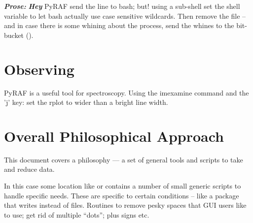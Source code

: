 \textbf{\emph{Prose:}} \textbf{\emph{Hey}} PyRAF send the line to bash; but! using a sub-shell
set {\color{verbcolor}{\verb#export#}} the {\color{verbcolor}{\verb#LC_ALL=C;#}}
shell variable to let bash actually use case sensitive wildcards. Then
{\color{verbcolor}{\verb#rm [a-z]_*fits 2> /dev/null;#}} remove the
file -- and in case there is some whining about the process, send the
whines to the bit-bucket ({\color{verbcolor}{\verb#/dev/null#}}).


\section{Observing}
PyRAF  is a useful tool for spectroscopy. Using
the imexamine command and the 'j' key: set the rplot to wider than a bright
line width. 


\clearpage
\section{Overall Philosophical Approach}

This document covers a philosophy --- a set of general tools and
scripts to take and reduce data.

In this case some location like {\color{verbcolor}{\verb#/opt/myobs/iraf/#}}
or {\color{verbcolor}{\verb#~/iraf/#}} contains a number of small generic
{\color{verbcolor}{\verb#.cl#}} scripts to handle specific needs. These
are specific to certain conditions -- like a package that writes {\color{verbcolor}{\verb#.fts#}}
instead of {\color{verbcolor}{\verb#.fits#}} files. Routines to remove pesky
spaces that GUI users like to use; get rid of multiple ``dots''; plus signs
etc. 

